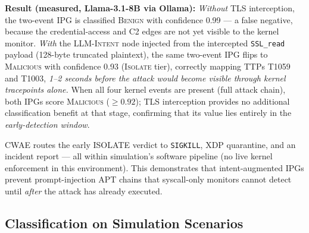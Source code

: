 \documentclass[journal]{IEEEtran}
\newcommand{\cwae}{CWAE}
\begin{document}
\textbf{Result (measured, Llama-3.1-8B via Ollama):}
\emph{Without} TLS interception, the two-event IPG is classified \textsc{Benign}
with confidence 0.99 --- a false negative, because the credential-access
and C2 edges are not yet visible to the kernel monitor.
\emph{With} the \textsc{LLM-Intent} node injected from the intercepted
\texttt{SSL\_read} payload (128-byte truncated plaintext), the same two-event
IPG flips to \textsc{Malicious} with confidence 0.93 (\textsc{Isolate} tier),
correctly mapping TTPs T1059 and T1003, \emph{1--2 seconds before the attack
would become visible through kernel tracepoints alone.}
When all four kernel events are present (full attack chain), both IPGs score
\textsc{Malicious} ($\geq 0.92$); TLS interception provides no additional
classification benefit at that stage, confirming that its value lies entirely
in the \emph{early-detection window}.

\cwae{} routes the early ISOLATE verdict to \texttt{SIGKILL}, XDP quarantine,
and an incident report --- all within simulation's software pipeline (no live
kernel enforcement in this environment).
This demonstrates that intent-augmented IPGs prevent prompt-injection APT
chains that syscall-only monitors cannot detect until \emph{after} the attack
has already executed.

\subsection{Classification on Simulation Scenarios}
\end{document}

